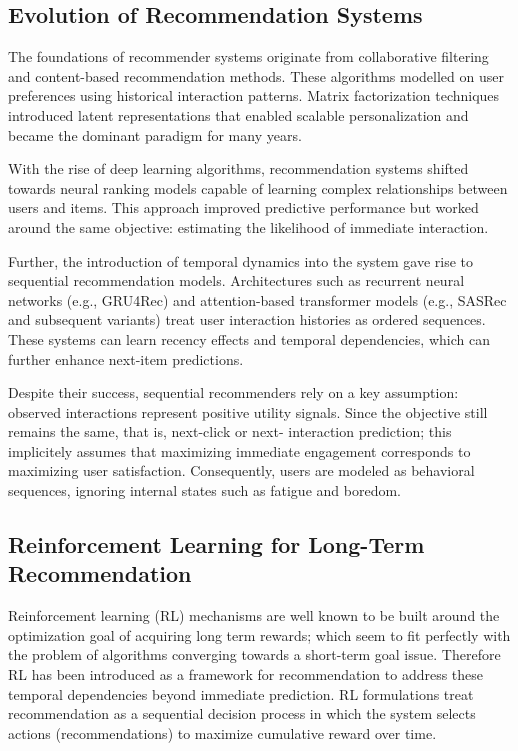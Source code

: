 
\subsection{Evolution of Recommendation Systems}

The foundations of recommender systems originate from 
collaborative filtering and content-based recommendation methods.
These algorithms modelled on user preferences 
using historical interaction patterns.
Matrix factorization techniques introduced latent representations that enabled
scalable personalization and became the dominant paradigm for many years.

With the rise of deep learning algorithms, recommendation systems shifted towards neural
ranking models capable of learning complex relationships between users and items.
This approach improved predictive performance but worked around the 
same objective: estimating the likelihood of immediate interaction.

Further, the introduction of temporal dynamics into the system gave rise to sequential recommendation models.
Architectures such as recurrent neural networks (e.g., GRU4Rec) and 
attention-based transformer models (e.g., SASRec and subsequent variants)
treat user interaction histories as ordered sequences.
These systems can learn recency effects and temporal dependencies, 
which can further enhance next-item predictions.

Despite their success, sequential recommenders rely on a key assumption:
observed interactions represent positive utility signals.
Since the objective still remains the same, that is, next-click or next-
interaction prediction; this implicitely assumes that maximizing immediate
engagement corresponds to maximizing user satisfaction.
Consequently, users are modeled as behavioral sequences, 
ignoring internal states such as fatigue and boredom. 


\subsection{Reinforcement Learning for Long-Term Recommendation}

Reinforcement learning (RL) mechanisms are well known to be built around the 
optimization goal of acquiring long term rewards; which seem to fit perfectly 
with the problem of algorithms converging towards a short-term goal issue.
Therefore RL has been introduced as a framework for recommendation to address 
these temporal dependencies beyond immediate prediction.
RL formulations treat recommendation as a sequential decision process in which the
system selects actions (recommendations) to maximize cumulative reward over time.

